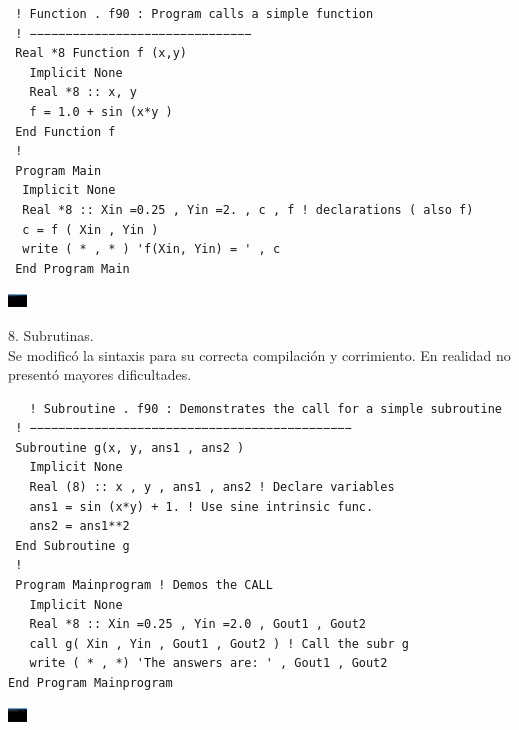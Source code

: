 \documentclass[12pt]{article}
\begin{document}
  \begin{verbatim}
 ! Function . f90 : Program calls a simple function
 ! −−−−−−−−−−−−−−−−−−−−−−−−−−−−−−−
 Real *8 Function f (x,y)
   Implicit None
   Real *8 :: x, y
   f = 1.0 + sin (x*y )
 End Function f
 !
 Program Main
  Implicit None
  Real *8 :: Xin =0.25 , Yin =2. , c , f ! declarations ( also f)
  c = f ( Xin , Yin )
  write ( * , * ) 'f(Xin, Yin) = ' , c
 End Program Main
 \end{verbatim}
  \begin{center}
\includegraphics[width=0.5cm]{Valorfuncion.png}\\
 \end{center}
  8. Subrutinas.\\
  Se modificó la sintaxis para su correcta compilación y corrimiento. En realidad no presentó mayores dificultades.\\
  \begin{verbatim}
   ! Subroutine . f90 : Demonstrates the call for a simple subroutine
 ! −−−−−−−−−−−−−−−−−−−−−−−−−−−−−−−−−−−−−−−−−−−−−
 Subroutine g(x, y, ans1 , ans2 )
   Implicit None
   Real (8) :: x , y , ans1 , ans2 ! Declare variables
   ans1 = sin (x*y) + 1. ! Use sine intrinsic func.
   ans2 = ans1**2
 End Subroutine g
 !
 Program Mainprogram ! Demos the CALL
   Implicit None
   Real *8 :: Xin =0.25 , Yin =2.0 , Gout1 , Gout2
   call g( Xin , Yin , Gout1 , Gout2 ) ! Call the subr g
   write ( * , *) 'The answers are: ' , Gout1 , Gout2
End Program Mainprogram
   \end{verbatim}
    \begin{center}
\includegraphics[width=0.5cm]{Subrutinas.png}\\
    \end{center}
  
  
\end{document}

